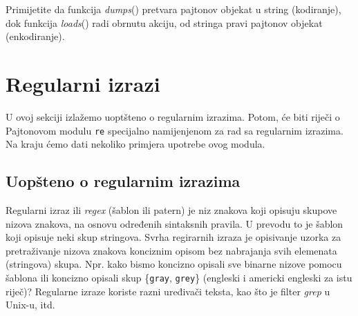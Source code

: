 Primijetite da funkcija \textit{dumps}() pretvara pajtonov objekat u string (kodiranje), dok funkcija \textit{loads}() radi obrnutu akciju, od stringa pravi pajtonov objekat (enkodiranje). 

\section{Regularni izrazi}

U ovoj sekciji izlažemo uoptšteno o regularnim izrazima. Potom, će biti riječi o Pajtonovom modulu \texttt{re} specijalno namijenjenom za rad sa regularnim izrazima. Na kraju ćemo dati nekoliko primjera upotrebe ovog modula. 

\subsection{Uopšteno o regularnim izrazima}

Regularni izraz ili \textit{regex} (šablon ili patern) je niz znakova koji opisuju skupove nizova znakova, na osnovu određenih sintaksnih pravila. U prevodu to je šablon koji opisuje neki skup stringova.  Svrha regirarnih izraza je opisivanje uzorka za pretraživanje nizova znakova konciznim opisom bez nabrajanja svih elemenata (stringova) skupa. Npr. kako bismo koncizno opisali sve binarne nizove
pomocu šablona ili koncizno opisali skup \{\texttt{gray}, \texttt{grey}\} (engleski i
americki engleski za istu riječ)? Regularne izraze koriste razni uređivači teksta, kao što je filter \textit{grep} u Unix-u, itd. 

